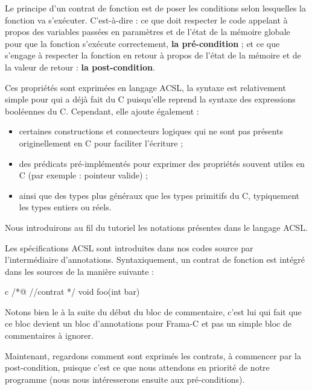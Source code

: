 Le principe d'un contrat de fonction est de poser les conditions selon 
lesquelles la fonction va s'exécuter. C'est-à-dire : ce que doit respecter 
le code appelant à propos des variables passées en paramètres et de l'état de
la mémoire globale pour que la fonction s'exécute correctement, 
\textbf{la pré-condition} ; et ce que s'engage à respecter la fonction en retour
à propos de l'état de la mémoire et de la valeur de retour : 
\textbf{la post-condition}.



Ces propriétés sont exprimées en langage ACSL, la syntaxe est relativement 
simple pour qui a déjà fait du C puisqu'elle reprend la syntaxe des expressions
booléennes du C. Cependant, elle ajoute également :



\begin{itemize}
\item certaines constructions et connecteurs logiques qui ne sont pas présents 
originellement en C pour faciliter l'écriture ;
\item des prédicats pré-implémentés pour exprimer des propriétés souvent utiles 
en C (par exemple : pointeur valide) ;
\item ainsi que des types plus généraux que les types primitifs du C, 
typiquement les types entiers ou réels.
\end{itemize}


Nous introduirons au fil du tutoriel les notations présentes dans le 
langage ACSL.



Les spécifications ACSL sont introduites dans nos codes source par 
l'intermédiaire d'annotations. Syntaxiquement, un contrat de fonction est 
intégré dans les sources de la manière suivante :



\begin{CodeBlock}{c}
/*@
  //contrat
*/
void foo(int bar){

}
\end{CodeBlock}



Notons bien le  à la suite du début du bloc de commentaire, c'est lui qui 
fait que ce bloc devient un bloc d'annotations pour Frama-C et pas un simple 
bloc de commentaires à ignorer.



Maintenant, regardons comment sont exprimés les contrats, à commencer par la
post-condition, puisque c'est ce que nous attendons en priorité de notre 
programme (nous nous intéresserons ensuite aux pré-conditions).



